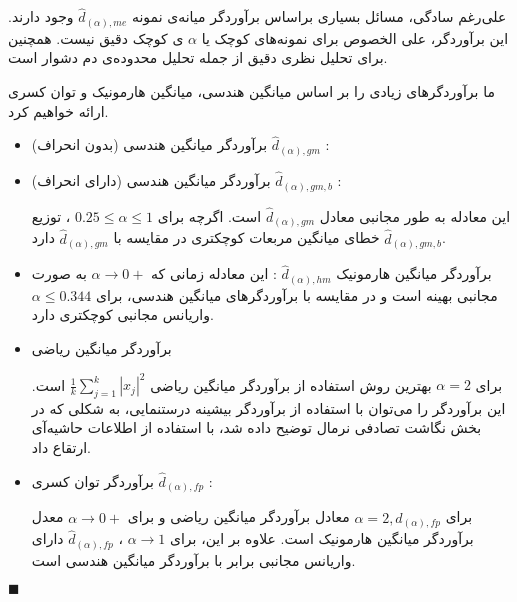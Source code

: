 علی‌رغم سادگی، مسائل بسیاری براساس برآوردگر میانه‌ی نمونه
$\hat{d}_{(\alpha), me}$
وجود دارند. این برآوردگر، علی الخصوص برای نمونه‌های کوچک یا 
$\alpha$
ی کوچک دقیق نیست. همچنین برای تحلیل نظری دقیق از جمله تحلیل محدوده‌ی دم دشوار است.

ما برآوردگرهای زیادی را بر اساس میانگین هندسی، میانگین هارمونیک و توان کسری ارائه خواهیم کرد.

\begin{itemize}
\item
برآوردگر میانگین هندسی (بدون انحراف) 
$\hat{d}_{(\alpha),gm}$
:
\item
برآوردگر میانگین هندسی (دارای انحراف) 
$\hat{d}_{(\alpha),gm,b}$
:

این معادله به طور مجانبی معادل
$\hat{d}_{(\alpha),gm}$
است. اگرچه برای 
$0.25 \leq \alpha \leq 1$
، توزیع
$\hat{d}_{(\alpha),gm,b}$
خطای میانگین مربعات کوچکتری در مقایسه با
$\hat{d}_{(\alpha),gm}$
دارد.
\item
برآوردگر میانگین هارمونیک 
$\hat{d}_{(\alpha),hm}$
:
این معادله زمانی که 
$\alpha \rightarrow 0+$
به صورت مجانبی بهینه است و در مقایسه با برآوردگرهای میانگین هندسی، برای 
$\alpha \leq 0.344$
واریانس مجانبی کوچکتری دارد.

\item
برآوردگر میانگین ریاضی

برای 
$\alpha = 2$
بهترین روش استفاده از برآوردگر میانگین ریاضی 
$\frac{1}{k} \sum_{j=1}^k \left| x_j \right|^2$
است. این برآوردگر را می‌توان با استفاده از برآوردگر بیشینه درستنمایی، به شکلی که در بخش نگاشت تصادفی نرمال توضیح داده شد، با استفاده از اطلاعات حاشیه‌آی ارتقاع داد.
\item
برآوردگر توان کسری
$\hat{d}_{(\alpha),fp}$
:

برای 
$\alpha = 2, \hat{d}_{(\alpha), fp}$
معادل برآوردگر میانگین ریاضی و برای 
$\alpha \rightarrow 0+$
معدل برآوردگر میانگین هارمونیک است. علاوه بر این، برای 
$\alpha \rightarrow 1$
،
$\hat{d}_{(\alpha),fp}$
دارای واریانس مجانبی برابر با برآوردگر میانگین هندسی است.
\end{itemize}

$\blacksquare$
\bigskip























